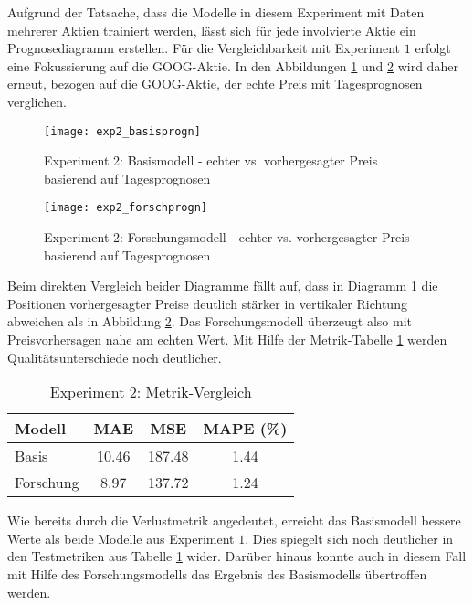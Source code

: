 Aufgrund der Tatsache, dass die Modelle in diesem Experiment mit Daten mehrerer Aktien trainiert werden, lässt sich für jede involvierte Aktie ein Prognosediagramm erstellen. Für die Vergleichbarkeit mit Experiment $1$ erfolgt eine Fokussierung auf die GOOG-Aktie.
In den Abbildungen \ref{fig:exp2_basisprogn} und \ref{fig:exp2_forschprogn} wird daher erneut, bezogen auf die GOOG-Aktie, der echte Preis mit Tagesprognosen verglichen.
\begin{figure}[H]
	\texttt{[image: exp2\_basisprogn]}
	\caption{Experiment 2: Basismodell - echter vs. vorhergesagter Preis basierend auf Tagesprognosen}
	\label{fig:exp2_basisprogn}
\end{figure}
\begin{figure}[H]
	\texttt{[image: exp2\_forschprogn]}
	\caption{Experiment 2: Forschungsmodell - echter vs. vorhergesagter Preis basierend auf Tagesprognosen}
	\label{fig:exp2_forschprogn}
\end{figure}
Beim direkten Vergleich beider Diagramme fällt auf, dass in Diagramm \ref{fig:exp2_basisprogn} die Positionen vorhergesagter Preise deutlich stärker in vertikaler Richtung abweichen als in Abbildung \ref{fig:exp2_forschprogn}. Das Forschungsmodell überzeugt also mit Preisvorhersagen nahe am echten Wert.
Mit Hilfe der Metrik-Tabelle \ref{tbl:exp2_model_metrics} werden Qualitätsunterschiede noch deutlicher.
\begin{table}[H]
	\centering
	\caption{Experiment 2: Metrik-Vergleich}
	\label{tbl:exp2_model_metrics}
	\begin{tabular}{lccc}
		\hline
		\textbf{Modell} & \textbf{MAE} & \textbf{MSE} & \textbf{MAPE (\%)} \\
		\hline
		Basis & 10.46 & 187.48 & 1.44 \\
		Forschung & 8.97 & 137.72 & 1.24 \\
		\hline
	\end{tabular}
\end{table}
Wie bereits durch die Verlustmetrik angedeutet, erreicht das Basismodell bessere Werte als beide Modelle aus Experiment $1$. Dies spiegelt sich noch deutlicher in den Testmetriken aus Tabelle \ref{tbl:exp2_model_metrics} wider. Darüber hinaus konnte auch in diesem Fall mit Hilfe des Forschungsmodells das Ergebnis des Basismodells übertroffen werden.

